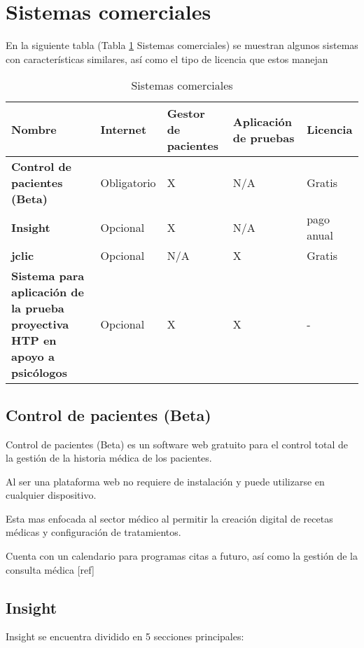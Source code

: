 \section{Sistemas comerciales}

En la siguiente tabla (Tabla \ref{tab:sistemComercial} Sistemas comerciales) se muestran algunos sistemas con características similares, así como el tipo de licencia que estos manejan

\begin{table}[htbp]
    \centering
    \begin{tabular}{ |m{10em}|m{4em}|m{4em}|m{4.5em}|m{3em}| }
    \hline
    Nombre & Internet & Gestor de pacientes & Aplicación de pruebas & Licencia
    \\
    \hline
    \textbf{Control de pacientes (Beta)} & Obligatorio & X & N/A & Gratis
    \\
    \hline
    \textbf{Insight} & Opcional & X & N/A & pago anual
    \\
    \hline
    \textbf{jclic} & Opcional & N/A & X & Gratis
    \\
    \hline
     \textbf{Sistema para aplicación de la prueba proyectiva HTP en apoyo a psicólogos} & Opcional & X & X & -
     \\
     \hline
    \end{tabular}
    \caption{Sistemas comerciales}
    \label{tab:sistemComercial}
\end{table}

\subsection{Control de pacientes (Beta)}
Control de pacientes (Beta) es un software web gratuito para el control total de la gestión de la historia médica de los pacientes.

Al ser una plataforma web no requiere de instalación y puede utilizarse en cualquier dispositivo.

Esta mas enfocada al sector médico al permitir la creación digital de recetas médicas y configuración de tratamientos.

Cuenta con un calendario para programas citas a futuro, así como la gestión de la consulta médica [ref]

\subsection{Insight}
Insight se encuentra dividido en 5 secciones principales:

